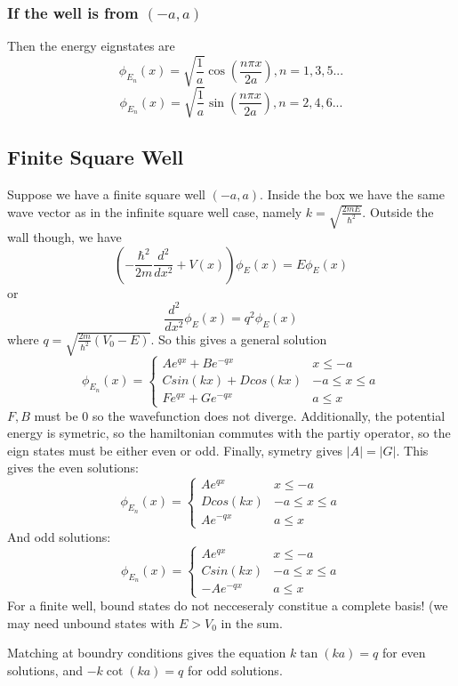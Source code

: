 \documentclass{homework}
\begin{document}
\subsubsection{If the well is from $(-a,a)$}

Then the energy eignstates are
\[\phi_{E_n}(x) = \sqrt{\frac{1}{a}}\cos \left( \frac{n\pi x}{2a} \right), n = 1,3,5...\]
\[\phi_{E_n}(x) = \sqrt{\frac{1}{a}}\sin \left( \frac{n\pi x}{2a} \right), n = 2,4,6...\]

\subsection{Finite Square Well}


Suppose we have a finite square well $(-a,a)$. Inside the box we have the same wave vector as in the infinite square well case, namely $k = \sqrt{\frac{2mE}{\hbar^2}}$. Outside the wall though, we have
\[(-\frac{\hbar^2}{2m}\frac{d^2}{dx^2}+ V(x))\phi_E(x) = E \phi_E(x)\]
or
\[\frac{d^2}{dx^2}\phi_E(x) = q^2\phi_E(x)\]
where $q = \sqrt{\frac{2m}{\hbar^2}(V_0 - E)}$.
So this gives a general solution 
 \[ \phi_{E_n}(x) = \begin{cases} 
          Ae^{qx}+Be^{-qx} & x\leq -a \\
          Csin(kx)+ Dcos(kx) & -a \leq x\leq a \\
          Fe^{qx}+Ge^{-qx} & a \leq x 
       \end{cases}
    \]
$F, B$ must be $0$ so the wavefunction does not diverge. Additionally, the potential energy is symetric, so the hamiltonian commutes with the partiy operator, so the eign states must be either even or odd. Finally, symetry gives $|A| = |G|$. This gives the even solutions:
 \[ \phi_{E_n}(x) = \begin{cases} 
          Ae^{qx} & x\leq -a \\
         Dcos(kx) & -a \leq x\leq a \\
          Ae^{-qx} & a \leq x 
       \end{cases}
    \]
And odd solutions:
 \[ \phi_{E_n}(x) = \begin{cases} 
          Ae^{qx} & x\leq -a \\
         Csin(kx) & -a \leq x\leq a \\
          -Ae^{-qx} & a \leq x 
       \end{cases}
    \]
For a finite well, bound states do not necceseraly constitue a complete basis! (we may need unbound states with $E>V_0$ in the sum.

Matching at boundry conditions gives the equation $k\tan(ka) = q$ for even solutions, and $-k\cot(ka) = q$ for odd solutions. 
\end{document}
